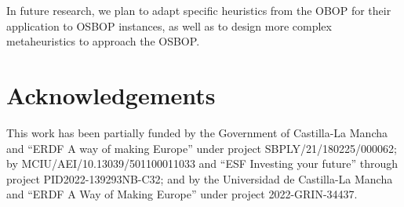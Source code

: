 \documentclass[preprint,12pt]{article}
\theoremstyle{definition}
\theoremstyle{remark}
\theoremstyle{example} %
\begin{document}
In future research, we plan to adapt specific heuristics from the OBOP for their application to OSBOP instances, as well as to design more complex metaheuristics to approach the OSBOP.






\section*{Acknowledgements}

This work has been partially funded by the Government of Castilla-La Mancha and ``ERDF A way of making Europe'' under project SBPLY/21/180225/000062; by MCIU/AEI/10.13039/501100011033 and ``ESF Investing your future'' through project PID2022-139293NB-C32; and by the Universidad de Castilla-La Mancha and ``ERDF A Way of Making Europe'' under project 2022-GRIN-34437.











%
%
\end{document}
